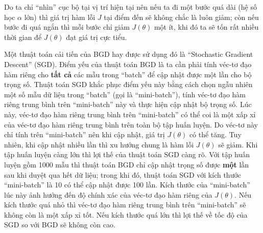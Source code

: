 	Do ta chỉ ``nhìn'' cục bộ tại vị trí hiện tại nên nếu ta đi một bước quá dài (hệ số học $\alpha$ lớn) thì giá trị hàm lỗi $J$ tại điểm đến sẽ không chắc là luôn giảm;
	còn nếu bước đi quá ngắn thì mỗi bước chỉ giảm $J(\theta)$ một ít, khi đó ta sẽ tốn rất nhiều thời gian để $J(\theta)$ đạt giá trị cực tiểu.
	
	Một thuật toán cải tiến của BGD hay được sử dụng đó là ``Stochastic Gradient Descent'' (SGD).
	Điểm yếu của thuật toán BGD là ta cần phải tính véc-tơ đạo hàm riêng cho \textbf{tất cả} các mẫu trong ``batch'' để cập nhật được một lần cho bộ trọng số.
	Thuật toán SGD khắc phục điểm yếu này bằng cách chọn ngẫu nhiên một số mẫu dữ liệu trong ``batch'' (gọi là ``mini-batch''), tính véc-tơ đạo hàm riêng trung bình trên ``mini-batch'' này và thực hiện cập nhật bộ trọng số.
	Lúc này, véc-tơ đạo hàm riêng trung bình trên ``mini-batch'' có thể coi là một xấp xỉ của véc-tơ đạo hàm riêng trung bình trên toàn bộ tập huấn luyện.
	Do véc-tơ này chỉ tính trên ``mini-batch'' nên khi cập nhật, giá trị $J(\theta)$ có thể tăng.
	Tuy nhiên, khi cập nhật nhiều lần thì xu hướng chung là hàm lỗi $J(\theta)$ sẽ giảm.
	Khi tập huấn luyện càng lớn thì lợi thế của thuật toán SGD càng rõ.
	Với tập huấn luyện gồm 1000 mẫu thì thuật toán BGD chỉ cập nhật trọng số được \textbf{một} lần sau khi duyệt qua hết dữ liệu; trong khi đó, thuật toán SGD với kích thước ``mini-batch'' là 10 có thể cập nhật được 100 lần.
	Kích thước của ``mini-batch'' lúc này ảnh hưởng đến độ chính xác của véc-tơ đạo hàm riêng của $J(\theta)$.
	Nếu kích thước quá nhỏ thì véc-tơ đạo hàm riêng trung bình trên ``mini-batch'' sẽ không còn là một xấp xỉ tốt.
	Nếu kích thước quá lớn thì lợi thế về tốc độ của SGD so với BGD sẽ không còn cao.
	
